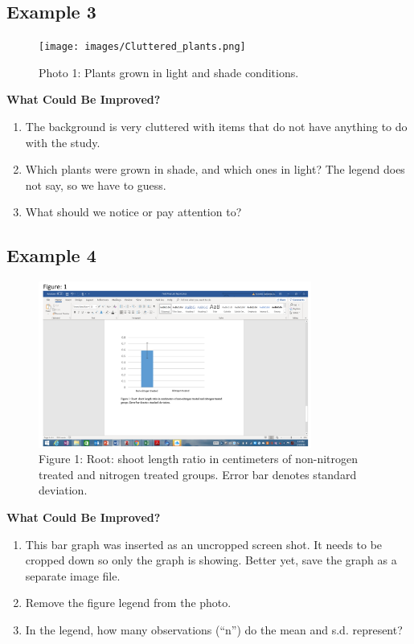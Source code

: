 \documentclass[
]{book}
\providecommand{\tightlist}{%
  \setlength{\itemsep}{0pt}\setlength{\parskip}{0pt}}
\begin{document}
\hypertarget{example-3-9}{%
\subsection{Example 3}\label{example-3-9}}

\begin{figure}
\centering
\texttt{[image: images/Cluttered\_plants.png]}
\caption{Photo 1: Plants grown in light and shade conditions.}
\end{figure}

\textbf{What Could Be Improved?}

\begin{enumerate}
\def\labelenumi{\arabic{enumi}.}
\tightlist
\item
  The background is very cluttered with items that do not have anything to do with the study.
\item
  Which plants were grown in shade, and which ones in light? The legend does not say, so we have to guess.
\item
  What should we notice or pay attention to?
\end{enumerate}

\hypertarget{example-4-3}{%
\subsection{Example 4}\label{example-4-3}}

\begin{figure}
\centering
\includegraphics[width=0.8\textwidth,height=\textheight]{images/Bad_crop.png}
\caption{Figure 1: Root: shoot length ratio in centimeters of non-nitrogen treated and nitrogen treated groups. Error bar denotes standard deviation.}
\end{figure}

\textbf{What Could Be Improved?}

\begin{enumerate}
\def\labelenumi{\arabic{enumi}.}
\tightlist
\item
  This bar graph was inserted as an uncropped screen shot. It needs to be cropped down so only the graph is showing. Better yet, save the graph as a separate image file.
\item
  Remove the figure legend from the photo.
\item
  In the legend, how many observations (``n'') do the mean and s.d. represent?
\end{enumerate}
\end{document}
